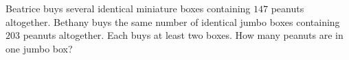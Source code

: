 Beatrice buys several identical miniature boxes containing $147$ peanuts altogether. Bethany buys the same number of identical jumbo boxes containing $203$ peanuts altogether. Each buys at least two boxes. How many peanuts are in one jumbo box?
